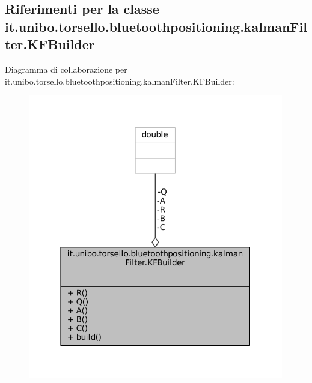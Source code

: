 \hypertarget{classit_1_1unibo_1_1torsello_1_1bluetoothpositioning_1_1kalmanFilter_1_1KFBuilder}{}\subsection{Riferimenti per la classe it.\+unibo.\+torsello.\+bluetoothpositioning.\+kalman\+Filter.\+K\+F\+Builder}
\label{classit_1_1unibo_1_1torsello_1_1bluetoothpositioning_1_1kalmanFilter_1_1KFBuilder}


Diagramma di collaborazione per it.\+unibo.\+torsello.\+bluetoothpositioning.\+kalman\+Filter.\+K\+F\+Builder\+:
\nopagebreak
\begin{figure}[H]
\begin{center}
\leavevmode
\includegraphics[width=316pt]{classit_1_1unibo_1_1torsello_1_1bluetoothpositioning_1_1kalmanFilter_1_1KFBuilder__coll__graph}
\end{center}
\end{figure}

